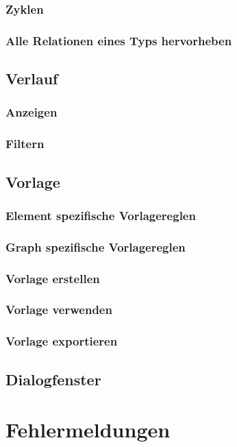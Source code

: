 \documentclass[enabledeprecatedfontcommands,fontsize=11pt,paper=a4,twoside]{scrartcl}
\newcounter{one}
\begin{document}
		\subsubsection{Zyklen}
		\subsubsection{Alle Relationen eines Typs hervorheben}		
	\subsection{Verlauf}
		\subsubsection{Anzeigen}
		\subsubsection{Filtern}
	\subsection{Vorlage}
		\subsubsection{Element spezifische Vorlagereglen}
		\subsubsection{Graph spezifische Vorlagereglen}
		\subsubsection{Vorlage erstellen}
		\subsubsection{Vorlage verwenden}
		\subsubsection{Vorlage exportieren}
	\subsection{Dialogfenster}
	\newpage
	\section{Fehlermeldungen} \label{sec:fehlermeldungen}
	
\end{document}
